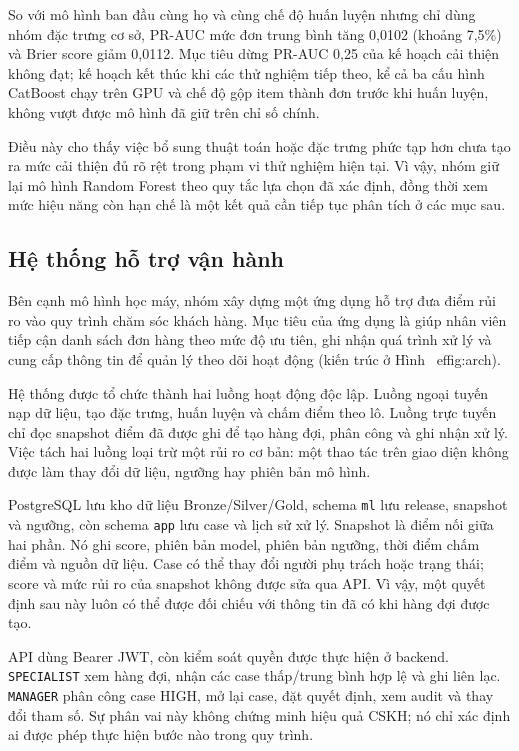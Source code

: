 \documentclass[12pt,a4paper]{report}
\begin{document}
So với mô hình ban đầu cùng họ và cùng chế độ huấn luyện nhưng chỉ dùng nhóm đặc trưng cơ sở, PR-AUC mức đơn trung bình tăng 0,0102 (khoảng 7,5\%) và Brier score giảm 0,0112. Mục tiêu dừng PR-AUC 0,25 của kế hoạch cải thiện không đạt; kế hoạch kết thúc khi các thử nghiệm tiếp theo, kể cả ba cấu hình CatBoost chạy trên GPU và chế độ gộp item thành đơn trước khi huấn luyện, không vượt được mô hình đã giữ trên chỉ số chính.

Điều này cho thấy việc bổ sung thuật toán hoặc đặc trưng phức tạp hơn chưa tạo ra mức cải thiện đủ rõ rệt trong phạm vi thử nghiệm hiện tại. Vì vậy, nhóm giữ lại mô hình Random Forest theo quy tắc lựa chọn đã xác định, đồng thời xem mức hiệu năng còn hạn chế là một kết quả cần tiếp tục phân tích ở các mục sau.

\subsection{Hệ thống hỗ trợ vận hành}\label{sec:system-api}

Bên cạnh mô hình học máy, nhóm xây dựng một ứng dụng hỗ trợ đưa điểm rủi ro vào quy trình chăm sóc khách hàng. Mục tiêu của ứng dụng là giúp nhân viên tiếp cận danh sách đơn hàng theo mức độ ưu tiên, ghi nhận quá trình xử lý và cung cấp thông tin để quản lý theo dõi hoạt động (kiến trúc ở Hình~
ef{fig:arch}).

Hệ thống được tổ chức thành hai luồng hoạt động độc lập. Luồng ngoại tuyến nạp dữ liệu, tạo đặc trưng, huấn luyện và chấm điểm theo lô. Luồng trực tuyến chỉ đọc snapshot điểm đã được ghi để tạo hàng đợi, phân công và ghi nhận xử lý. Việc tách hai luồng loại trừ một rủi ro cơ bản: một thao tác trên giao diện không được làm thay đổi dữ liệu, ngưỡng hay phiên bản mô hình.

PostgreSQL lưu kho dữ liệu Bronze/Silver/Gold, schema \texttt{ml} lưu release, snapshot và ngưỡng, còn schema \texttt{app} lưu case và lịch sử xử lý. Snapshot là điểm nối giữa hai phần. Nó ghi score, phiên bản model, phiên bản ngưỡng, thời điểm chấm điểm và nguồn dữ liệu. Case có thể thay đổi người phụ trách hoặc trạng thái; score và mức rủi ro của snapshot không được sửa qua API. Vì vậy, một quyết định sau này luôn có thể được đối chiếu với thông tin đã có khi hàng đợi được tạo.

API dùng Bearer JWT, còn kiểm soát quyền được thực hiện ở backend. \texttt{SPECIALIST} xem hàng đợi, nhận các case thấp/trung bình hợp lệ và ghi liên lạc. \texttt{MANAGER} phân công case HIGH, mở lại case, đặt quyết định, xem audit và thay đổi tham số. Sự phân vai này không chứng minh hiệu quả CSKH; nó chỉ xác định ai được phép thực hiện bước nào trong quy trình.
\end{document}
